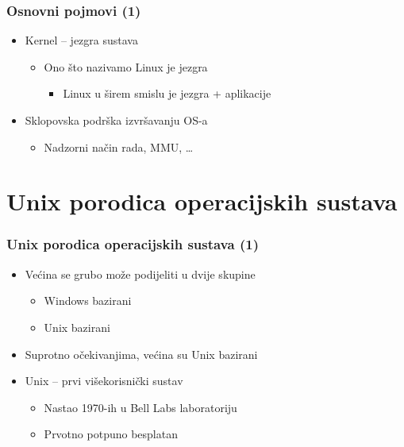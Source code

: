 \documentclass{beamer}
\begin{document}
\begin{frame}[t]
\frametitle{Osnovni pojmovi (1)}
\begin{itemize}
  \item Kernel -- jezgra sustava
  \begin{itemize}
    \item Ono što nazivamo Linux je jezgra
    \begin{itemize}
      \item Linux u širem smislu je jezgra + aplikacije
    \end{itemize}
  \end{itemize}
  \item Sklopovska podrška izvršavanju OS-a
  \begin{itemize}
    \item Nadzorni način rada, MMU, \ldots
  \end{itemize}
\end{itemize}
\end{frame}

\section{Unix porodica operacijskih sustava}
\begin{frame}[t]
\frametitle{Unix porodica operacijskih sustava (1)}
\begin{itemize}
  \item Većina se grubo može podijeliti u dvije skupine
  \begin{itemize}
    \item Windows bazirani
    \item Unix bazirani
  \end{itemize}
  \item Suprotno očekivanjima, većina su Unix bazirani
  \item Unix – prvi višekorisnički sustav
  \begin{itemize}
    \item Nastao 1970-ih u Bell Labs laboratoriju
    \item Prvotno potpuno besplatan
  \end{itemize}
\end{itemize}
\end{frame} 
\end{document}
